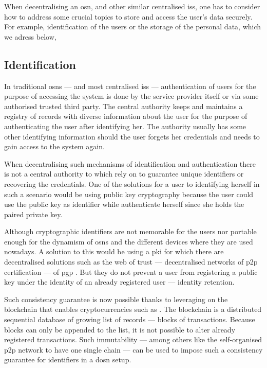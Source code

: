 When decentralising an \ac{osn}, and other similar centralised \acp{is}, one has 
to consider how to address some crucial topics to store and access the user's data 
securely. For example, identification of the users or the storage of the personal 
data, which we adress below, 

\subsection{Identification}
    \label{subsection:thesis:indentification}
In traditional \acp{osn} --- and most centralised \acp{is} 
--- authentication of users for the purpose of accessing the system is done by the 
service provider itself or via some authorised trusted third party. The central 
authority keeps and maintains a registry of records with diverse information about 
the user for the purpose of authenticating the user after identifying her. The authority 
usually has some other identifying information should the user forgets her credentials 
and needs to gain access to the system again.

When decentralising such mechanisms of identification and authentication there is 
not a central authority to which rely on to guarantee unique identifiers or recovering 
the credentials. One of the solutions for a user to identifying herself in such 
a scenario would be using public key cryptography because the user could use the 
public key as identifier while authenticate herself since she holds the paired private 
key. 

Although cryptographic identifiers are not memorable for the users nor portable 
enough for the dynamism of \acp{osn} and the different devices where they are used 
nowadays. A solution to this would be using a \ac{pki} for which there are decentralised 
solutions such as the web of trust ---  decentralised networks of \ac{p2p} certification 
--- of \ac{pgp} \cite{Stallings95, Abdul97}. But they do not prevent a user from 
registering a public key under the identity of an already registered user --- identity 
retention. 

Such consistency guarantee is now possible thanks to leveraging on the blockchain 
that enables cryptocurrencies such as \Bitcoin \cite{Nakamoto08}. The blockchain 
is a distributed sequential database of growing list of records --- blocks of transactions. 
Because blocks can only be appended to the list, it is not possible to alter already 
registered transactions. Such immutability --- among others like the self-organised 
\ac{p2p} network to have one single chain --- can be used to impose such a consistency 
guarantee for identifiers in a \ac{dosn} setup.

